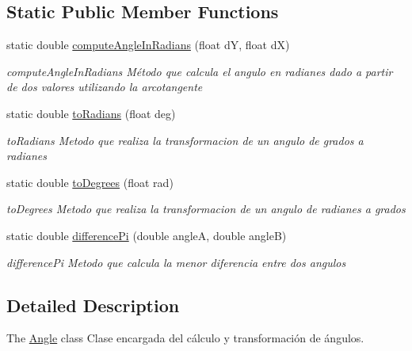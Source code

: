 \subsection*{Static Public Member Functions}
\begin{DoxyCompactItemize}
\item 
static double \hyperlink{class_angle_ab883e3d7040fd7cfcf0e90da2cbe84ad}{compute\+Angle\+In\+Radians} (float d\+Y, float d\+X)
\begin{DoxyCompactList}\small\item\em compute\+Angle\+In\+Radians Método que calcula el angulo en radianes dado a partir de dos valores utilizando la arcotangente \end{DoxyCompactList}\item 
static double \hyperlink{class_angle_a5dfc4cbb910399852dae886aa0d032e6}{to\+Radians} (float deg)
\begin{DoxyCompactList}\small\item\em to\+Radians Metodo que realiza la transformacion de un angulo de grados a radianes \end{DoxyCompactList}\item 
static double \hyperlink{class_angle_ab8e04a32bd7ca82f75621000e2ba8547}{to\+Degrees} (float rad)
\begin{DoxyCompactList}\small\item\em to\+Degrees Metodo que realiza la transformacion de un angulo de radianes a grados \end{DoxyCompactList}\item 
static double \hyperlink{class_angle_ae1eaf7179e1986c65820bc0f9aa5e45b}{difference\+Pi} (double angle\+A, double angle\+B)
\begin{DoxyCompactList}\small\item\em difference\+Pi Metodo que calcula la menor diferencia entre dos angulos \end{DoxyCompactList}\end{DoxyCompactItemize}


\subsection{Detailed Description}
The \hyperlink{class_angle}{Angle} class Clase encargada del cálculo y transformación de ángulos. 

